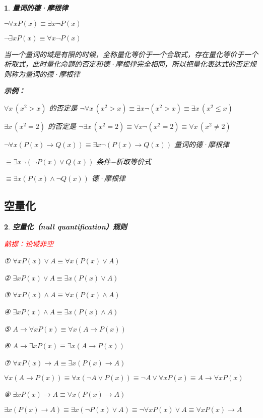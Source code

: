 \documentclass[UTF8]{report}
\theoremstyle{MyLineTheoremStyle} %
\theoremstyle{MyBlockTheoremStyle} %
\theoremstyle{MySubsubsectionStyle} %
\newtheorem{definition}{}
\begin{document}
\begin{definition}
    \textbf{量词的德·摩根律}\par
    $\neg \forall x P(x) \equiv \exists x \neg P(x)$\par
    $\neg \exists x P(x) \equiv \forall x \neg P(x)$\par
    当一个量词的域是有限的时候，全称量化等价于一个合取式，存在量化等价于一个析取式，此时量化命题的否定和德·摩根律完全相同，所以把量化表达式的否定规则称为量词的德·摩根律\par

    \textbf{示例：}\par
    $\forall x \, (x^2 > x)$ 的否定是 $\neg \forall x \, (x^2 > x) \equiv \exists x \neg (x^2 > x) \equiv \exists x \, (x^2 \leq x)$\par
    $\exists x \, (x^2 = 2)$ 的否定是 $\neg \exists x \,(x^2 = 2) \equiv \forall x \neg (x^2 = 2) \equiv \forall x \, (x^2 \neq 2)$\par
    $\neg \forall x (P(x) \rightarrow Q(x)) \equiv \exists x \neg (P(x) \rightarrow Q(x))$ 量词的德·摩根律\par
    $\equiv \exists x \neg (\neg P(x) \lor Q(x))$ 条件−析取等价式\par
    $\equiv \exists x (P(x) \land \neg Q(x))$ 德·摩根律\par
\end{definition}

\subsection{空量化}

\begin{definition}
    \textbf{空量化（null quantification）规则}\par
    \textcolor{red}{前提：论域非空}

    ① $\forall x P(x) \lor A \equiv \forall x (P(x) \lor A)$\par
    ② $\exists x P(x) \lor A \equiv \exists x (P(x) \lor A)$\par
    ③ $\forall x P(x) \land A \equiv \forall x (P(x) \land A)$\par
    ④ $\exists x P(x) \land A \equiv \exists x (P(x) \land A)$\par
    ⑤ $A \rightarrow \forall x P(x) \equiv \forall x (A \rightarrow P(x))$\par
    ⑥ $A \rightarrow \exists x P(x) \equiv \exists x (A \rightarrow P(x))$\par
    ⑦ $\forall x P(x) \rightarrow A \equiv \exists x (P(x) \rightarrow A)$\par
    $\forall x (A \rightarrow P(x)) \equiv \forall x (\neg A \lor P(x)) \equiv \neg A \lor \forall x P(x) \equiv A \rightarrow \forall x P(x)$\par
    ⑧ $\exists x P(x) \rightarrow A \equiv \forall x (P(x) \rightarrow A)$\par
    $\exists x (P(x) \rightarrow A) \equiv \exists x (\neg P(x) \lor A) \equiv \neg \forall x P(x) \lor A \equiv \forall x P(x) \rightarrow A$\par
\end{definition}
\end{document}
